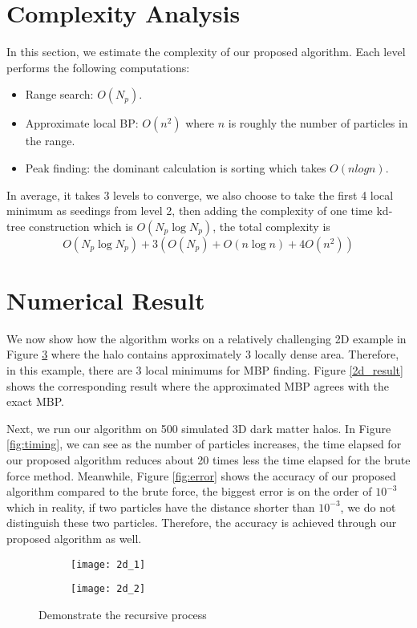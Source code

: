 \section{Complexity Analysis}
In this section, we estimate the complexity of our proposed algorithm. Each level performs the following computations:
\begin{itemize}
  \item Range search: $O(N_p)$. 
  \item Approximate local BP: $O(n^2)$ where $n$ is roughly the number of particles in the range.
  \item Peak finding: the dominant calculation is sorting which takes $O(nlogn)$. 
\end{itemize}
In average, it takes 3 levels to converge, we also choose to take the first 4 local minimum as seedings from level 2, then adding the complexity of one time kd-tree construction which is $O(N_p \log N_p)$, the total complexity is
\[\displaystyle O(N_p \log N_p)+3\left(O(N_p)+O(n\log n)+4O(n^2)\right)\] 
\section{Numerical Result}

We now show how the algorithm works on a relatively challenging 2D example in Figure \ref{illu_level} where the halo contains approximately 3 locally dense area. Therefore, in this example, there are 3 local minimums for MBP finding. Figure \ref{2d_result} shows the corresponding result where the approximated MBP agrees with the exact MBP.

Next, we run our algorithm on 500 simulated 3D dark matter halos. In Figure \ref{fig:timing}, we can see as the number of particles increases, the time elapsed for our proposed algorithm reduces about 20 times less the time elapsed for the brute force method. Meanwhile, Figure \ref{fig:error} shows the accuracy of our proposed algorithm compared to the brute force, the biggest error is on the order of $10^{-3}$ which in reality, if two particles have the distance shorter than $10^{-3}$, we do not distinguish these two particles. Therefore, the accuracy is achieved through our proposed algorithm as well.  

\begin{figure}[ht]
\begin{subfigure}[b]{0.5\linewidth}
\texttt{[image: 2d\_1]}
\caption{\label{fig:1st}}
\end{subfigure}
\begin{subfigure}[b]{0.5\linewidth}
\texttt{[image: 2d\_2]}
\caption{\label{fig:2nd}}
\end{subfigure}
\caption{Demonstrate the recursive process}
\label{illu_level}
\end{figure}

